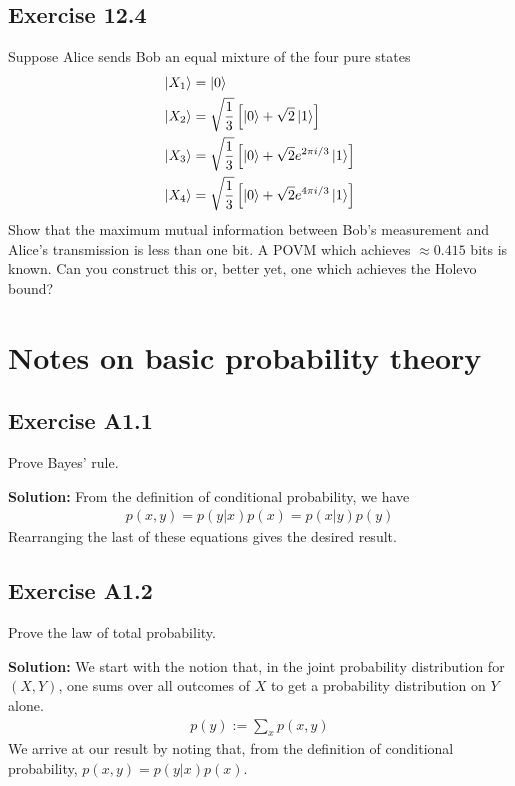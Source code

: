 \documentclass{book}
\begin{document}
\section*{Exercise 12.4}
    Suppose Alice sends Bob an equal mixture of the four pure states
    \begin{align}
        \ket{X_1} &= \ket{0} \\
        \ket{X_2} &= \sqrt{\frac{1}{3}}\left[\ket{0} + \sqrt{2}\ket{1}\right] \\
        \ket{X_3} &= \sqrt{\frac{1}{3}}\left[\ket{0} + \sqrt{2} e^{2\pi i /3}\ket{1}\right] \\
        \ket{X_4} &= \sqrt{\frac{1}{3}}\left[\ket{0} + \sqrt{2} e^{4\pi i /3}\ket{1}\right]
    \end{align}
    Show that the maximum mutual information between Bob’s measurement and Alice’s transmission is less than one bit. A POVM which achieves $\approx 0.415$ bits is known. Can you construct this or, better yet, one which achieves the Holevo bound?

\appendix
\renewcommand{\thechapter}{\arabic{chapter}}
\renewcommand{\theequation}{A\thechapter.\arabic{equation}}

\chapter{Notes on basic probability theory}

\section*{Exercise A1.1} 
    Prove Bayes' rule.
    
    \textbf{Solution:} From the definition of conditional probability, we have
    \begin{align}
        p(x,y) = p(y|x)p(x) = p(x|y)p(y)
    \end{align}
    Rearranging the last of these equations gives the desired result.

\section*{Exercise A1.2}
    Prove the law of total probability.
    
    \textbf{Solution:} We start with the notion that, in the joint probability distribution for $(X,Y)$, one sums over all outcomes of $X$ to get a probability distribution on $Y$ alone.
    \begin{align}
        p(y) := \sum_x p(x,y)
    \end{align}
    We arrive at our result by noting that, from the definition of conditional probability, $p(x,y) = p(y|x)p(x)$.
\end{document}
